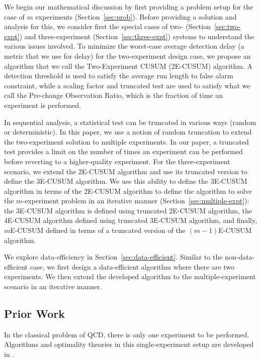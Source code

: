 \documentclass[journal, onecolumn]{IEEEtran}
\begin{document}
We begin our mathematical discussion by first providing a problem setup for the case of $m$ experiments (Section~\ref{sec:prob}). Before providing a solution and analysis for this, we consider first the special cases of two- (Section~\ref{sec:two-expt}) and three-experiment (Section~\ref{sec:three-expt}) systems to understand the various issues involved. To minimize the worst-case average detection delay (a metric that we use for delay) for the two-experiment design case, we propose an algorithm that we call the Two-Experiment CUSUM (2E-CUSUM) algorithm. A detection threshold is used to satisfy the average run length to false alarm constraint, while a scaling factor and truncated test are used to satisfy what we call the Pre-change Observation Ratio, which is the fraction of time an experiment is performed. 

In sequential analysis, a statistical test can be truncated in various ways (random or deterministic). In this paper, we use a notion of random truncation to extend the two-experiment solution to multiple experiments. In our paper, a truncated test provides a limit on the number of times an experiment can be performed before reverting to a higher-quality experiment. For the three-experiment scenario, we extend the 2E-CUSUM algorithm and use its truncated version to define the 3E-CUSUM algorithm. We use this ability to define the 3E-CUSUM algorithm in terms of the 2E-CUSUM algorithm to define the algorithm to solve the $m$-experiment problem in an iterative manner (Section~\ref{sec:multiple-expt}): the 3E-CUSUM algorithm is defined using truncated 2E-CUSUM algorithm, the 4E-CUSUM algorithm defined using truncated 3E-CUSUM algorithm, and finally, $m$E-CUSUM defined in terms of a truncated version of the $(m-1)$E-CUSUM algorithm. 

We explore data-efficiency in Section~\ref{sec:data-efficient}. Similar to the non-data-efficient case, we first design a data-efficient algorithm where there are two experiments. We then extend the developed algorithm to the multiple-experiment scenario in an iterative manner.




\subsection{Prior Work}
\label{sec:PriorWork}
In the classical problem of QCD, there is only one experiment to be performed. Algorithms and optimality theories in this single-experiment setup are developed in \cite{shewhart1925, page1954, shiryaev1963, lorden1971, moustakides1986optimal, lai1998information, tartakovsky2005general, veeravalli2013, poor2009, tartakovsky2014, tartakovsky2019}. 
\end{document}
